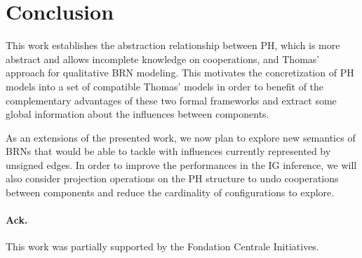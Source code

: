 \section{Conclusion}

This work establishes the abstraction relationship between PH, which is more abstract and allows incomplete knowledge on cooperations, and Thomas' approach for qualitative BRN modeling.
This motivates the concretization of PH models into a set of compatible Thomas' models in order to benefit of the complementary advantages of these two formal frameworks and extract some global information about the influences between components.

\begin{comment}
We first propose an original inference of the Interaction Graph (IG) from a BRN
having its dynamics specified in the PH framework.
An IG gives a compact abstract representation of the influence of the components between each
others.
Then, based on a prior inference of Ren\'e Thomas' parametrization for BRNs from a PH model, we
delimit the set of compatible Thomas' parametrizations that are compatible with the PH dynamics,
and give arguments for their correctness.
A parametrization is compatible with the PH if its dynamics (in terms of possible transitions) is included in the PH dynamics.
The enumeration of such parametrizations is efficiently tackled using Answer Set Programming.
We illustrate the overall method on simple examples and large biological models.
\end{comment}

As an extensions of the presented work, we now plan to explore new semantics of BRNs that would be able to tackle with influences currently represented by unsigned edges.
In order to improve the performances in the IG inference, we will also consider projection operations on
the PH structure to undo cooperations between components and reduce the cardinality of
configurations to explore. %

\paragraph{Ack.}
This work was partially supported by the Fondation Centrale Initiatives.
